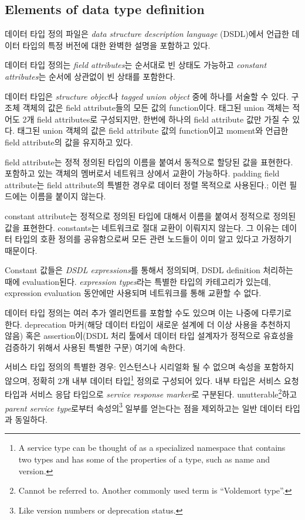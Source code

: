 \subsection{Elements of data type definition}\label{sec:dsdl_elements_of_data_type_definition}

데이터 타입 정의 파일은 \emph{data structure description language} (DSDL)에서 언급한 데이터 타입의 특정 버전에 대한 완벽한 설명을 포함하고 있다.

데이터 타입 정의는 \emph{field attributes}는 순서대로 빈 상태도 가능하고 \emph{constant attributes}는 순서에 상관없이 빈 상태를 포함한다.

데이터 타입은 \emph{structure object}나 \emph{tagged union object} 중에 하나를 서술할 수 있다.
구조체 객체의 값은 field attribute들의 모든 값의 function이다.
태그된 union 객체는 적어도 2개 field attributes로 구성되지만,
한번에 하나의 field attribute 값만 가질 수 있다.
태그된 union 객체의 값은 field attribute 값의 function이고 moment와 언급한 field attribute의 값을 유지하고 있다.

field attribute는 정적 정의된 타입의 이름을 붙여서 동적으로 할당된 값을 표현한다. 포함하고 있는 객체의 멤버로서 네트워크 상에서 교환이 가능하다.
padding field attribute는 field attribute의 특별한 경우로 데이터 정렬 목적으로 사용된다.;
이런 필드에는 이름을 붙이지 않는다.

constant attribute는 정적으로 정의된 타입에 대해서 이름을 붙여서 정적으로 정의된 값을 표현한다.
constants는 네트워크로 절대 교환이 이뤄지지 않는다. 그 이유는 데이터 타입의 호환 정의를 공유함으로써 모든 관련 노드들이 이미 알고 있다고 가정하기 때문이다.

Constant 값들은 \emph{DSDL expressions}를 통해서 정의되며,
DSDL definition 처리하는 때에 evaluation된다.
\emph{expression types}라는 특별한 타입의 카테고리가 있는데,
expression evaluation 동안에만 사용되며 네트워크를 통해 교환할 수 없다.

데이터 타입 정의는 여러 추가 엘리먼트를 포함할 수도 있으며 이는 나중에 다루기로 한다.
deprecation 마커(해당 데이터 타입이 새로운 설계에 더 이상 사용을 추천하지 않음) 혹은 assertion이(DSDL 처리 툴에서 데이터 타입 설계자가 정적으로 유효성을 검증하기 위해서 사용된 특별한 구문) 여기에 속한다.

서비스 타입 정의의 특별한 경우:
인스턴스나 시리얼화 될 수 없으며 속성을 포함하지 않으며,
정확히 2개 내부 데이터 타입\footnote{
    A service type can be thought of as a specialized namespace that contains two types and
    has some of the properties of a type, such as name and version.
} 정의로 구성되어 있다.
내부 타입은 서비스 요청 타입과 서비스 응답 타입으로 \emph{service response marker}로 구분된다.
unutterable\footnote{%
Cannot be referred to. Another commonly used term is ``Voldemort type''.
}하고 \emph{parent service type}로부터 속성의\footnote{Like version numbers or deprecation status.} 일부를 얻는다는 점을 제외하고는 일반 데이터 타입과 동일하다.

